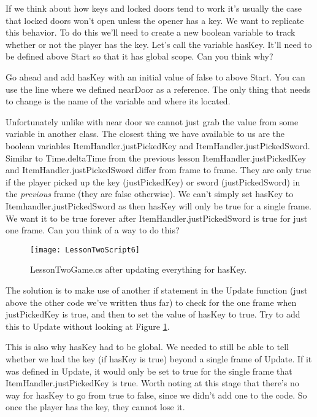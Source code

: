 \documentclass{article}
\begin{document}
If we think about how keys and locked doors tend to work it's usually the case that locked doors won't open unless the opener has a key. We want to replicate this behavior. To do this we'll need to create a new boolean variable to track whether or not the player has the key. Let's call the variable hasKey. It'll need to be defined above Start so that it has global scope. Can you think why? 

Go ahead and add hasKey with an initial value of false to above Start. You can use the line where we defined nearDoor as a reference. The only thing that needs to change is the name of the variable and where its located. 

Unfortunately unlike with near door we cannot just grab the value from some variable in another class. The closest thing we have available to us are the boolean variables ItemHandler.justPickedKey and ItemHandler.justPickedSword. Similar to Time.deltaTime from the previous lesson ItemHandler.justPickedKey and ItemHandler.justPickedSword differ from frame to frame. They are only true if the player picked up the key (justPickedKey) or sword (justPickedSword) in the \textit{previous} frame (they are false otherwise). We can't simply set hasKey to Itemhandler.justPickedSword as then hasKey will only be true for a single frame. We want it to be true forever after ItemHandler.justPickedSword is true for just one frame. Can you think of a way to do this?

\begin{figure}
  \texttt{[image: LessonTwoScript6]}
  \caption{LessonTwoGame.cs after updating everything for hasKey.}
  \label{fig:LessonTwoScript6}
\end{figure}

The solution is to make use of another if statement in the Update function (just above the other code we've written thus far) to check for the one frame when justPickedKey is true, and then to set the value of hasKey to true. Try to add this to Update without looking at Figure \ref{fig:LessonTwoScript6}. 

This is also why hasKey had to be global. We needed to still be able to tell whether we had the key (if hasKey is true) beyond a single frame of Update. If it was defined in Update, it would only be set to true for the single frame that ItemHandler.justPickedKey is true. Worth noting at this stage that there's no way for hasKey to go from true to false, since we didn't add one to the code. So once the player has the key, they cannot lose it.
\end{document}
